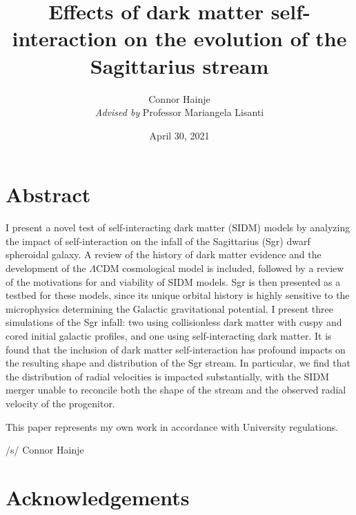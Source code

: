 \documentclass[12pt,oneside]{book}
\title{Effects of dark matter self-interaction on the evolution of the Sagittarius stream}
\author{Connor Hainje\\\textit{Advised by} Professor Mariangela Lisanti}
\date{April 30, 2021}
\begin{document}
\maketitle

\onehalfspacing
{}

\chapter*{Abstract}

I present a novel test of self-interacting dark matter (SIDM) models by
analyzing the impact of self-interaction on the infall of the Sagittarius
(Sgr) dwarf spheroidal galaxy.  A review of the history of dark matter
evidence and the development of the $\Lambda$CDM cosmological model is
included, followed by a review of the motivations for and viability of SIDM
models. Sgr is then presented as a testbed for these models, since its unique
orbital history is highly sensitive to the microphysics determining the Galactic
gravitational potential. I present three simulations of the Sgr infall: two
using collisionless dark matter with cuspy and cored initial galactic profiles,
and one using self-interacting dark matter.  It is found that the inclusion of
dark matter self-interaction has profound impacts on the resulting shape and
distribution of the Sgr stream.  In particular, we find that the distribution of
radial velocities is impacted substantially, with the SIDM merger unable to
reconcile both the shape of the stream and the observed radial velocity of the
progenitor. 

\vspace{0.25in}
This paper represents my own work in accordance with University regulations.

\vspace{0.1in}
\hspace{3.5in}/s/ Connor Hainje

\newpage

\newpage

\singlespacing
\tableofcontents 
\newpage

\onehalfspacing








\setcounter{secnumdepth}{-1}
\chapter{Acknowledgements}
\end{document}
